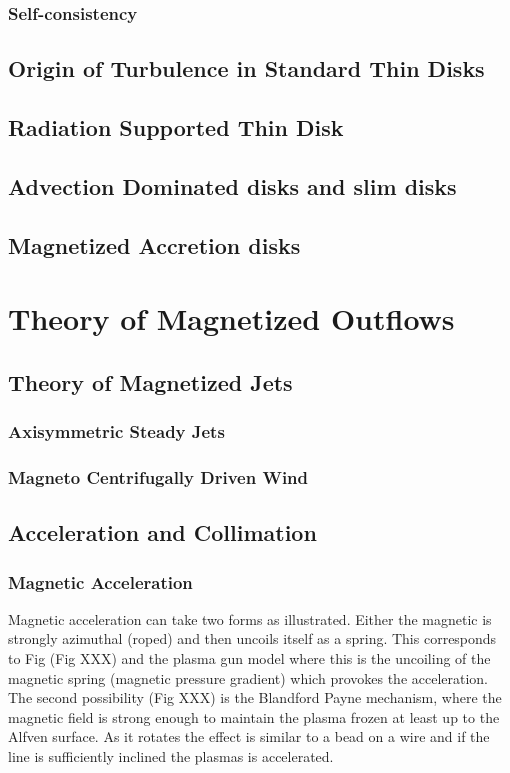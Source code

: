 \documentclass[10pt,a4paper,english,draft]{article}
\begin{document}
\subsubsection{Self-consistency}
\subsection{Origin of Turbulence in Standard Thin Disks}
\subsection{Radiation Supported Thin Disk}
\subsection{Advection Dominated disks and slim disks}
\subsection{Magnetized Accretion disks}

\section{Theory of Magnetized Outflows}
\subsection{Theory of Magnetized Jets}
\subsubsection{Axisymmetric Steady Jets}
\subsubsection{Magneto Centrifugally Driven Wind}
\subsection{Acceleration and Collimation}
\subsubsection{Magnetic Acceleration}

Magnetic acceleration can take two forms as illustrated. Either the magnetic is strongly
azimuthal (roped) and then uncoils itself as a spring. This corresponds to Fig (Fig XXX)
and the plasma gun model where this is the uncoiling of the magnetic spring (magnetic pressure gradient)
which provokes the acceleration. The second possibility (Fig XXX) is the Blandford Payne mechanism, where the magnetic field
is strong enough to maintain the plasma frozen at least up to the Alfven surface. As it rotates the effect is similar to a bead
on a wire and if the line is sufficiently inclined the plasmas is accelerated.
\end{document}
